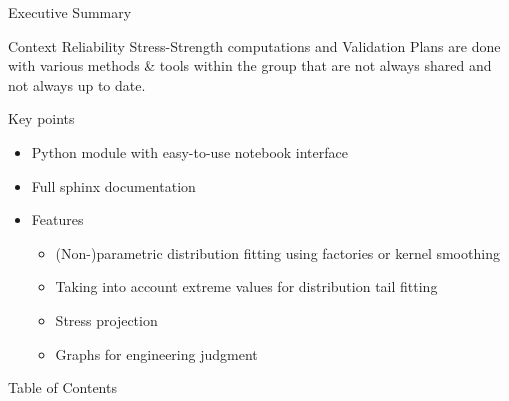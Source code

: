 \documentclass{renault-template}
\begin{document}
\begin{frame}{Executive Summary}
  \fontsize{8}{8}\selectfont
  \begin{block}{Context}
    Reliability Stress-Strength computations and Validation Plans are done with various methods \& tools within the group that are not always shared and not always up to date.
  \end{block}

  \begin{block}{Key points}
    \begin{itemize}
    \item Python module with easy-to-use notebook interface
    \item Full sphinx documentation
    \item Features
      \begin{itemize}
      \item (Non-)parametric distribution fitting using factories or kernel smoothing
      \item Taking into account extreme values for distribution tail fitting
      \item Stress projection
      \item Graphs for engineering judgment
      \end{itemize}
    \end{itemize}
  \end{block}

\end{frame}

\begin{frame}{Table of Contents}
  \tableofcontents %
\end{frame}

\end{document}
